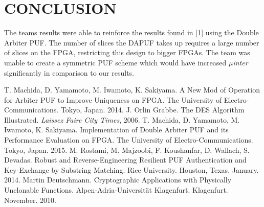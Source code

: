 \documentclass[letterpaper, 10 pt, conference]{ieeeconf}  %
\begin{document}
\section{CONCLUSION}

The teams results were able to reinforce the results found in [1] using the Double Arbiter PUF. The number of slices the DAPUF takes up requires a large number of slices on the FPGA, restricting this design to bigger FPGAs. The team was unable to create a symmetric PUF scheme which would have increased \emph{$\mu$inter} significantly in comparison to our results.

\addtolength{\textheight}{-12cm}   %















\begin{thebibliography}{99}

 T. Machida, D. Yamamoto, M. Iwamoto, K. Sakiyama. A New Mod of Operation for Arbiter PUF to Improve Uniqueness on FPGA. The University of Electro-Communications. Tokyo, Japan. 2014.
 J. Orlin Grabbe. The DES Algorithm Illustrated. \emph{Laissez Faire City Times}, 2006.
 T. Machida, D. Yamamoto, M. Iwamoto, K. Sakiyama. Implementation of Double Arbiter PUF and its Performance Evaluation on FPGA. The University of Electro-Communications. Tokyo, Japan. 2015.
 M. Rostami, M. Majzoobi, F. Koushanfar, D. Wallach, S. Devadas. Robust and Reverse-Engineering Resilient PUF Authentication and Key-Exchange by Substring Matching. Rice University. Houston, Texas. January. 2014.
 Martin Deutschmann. Cryptographic Applications with Physically Unclonable Functions. Alpen-Adria-Universit{\"a}t Klagenfurt. Klagenfurt. November. 2010.

\end{thebibliography}
\end{document}
